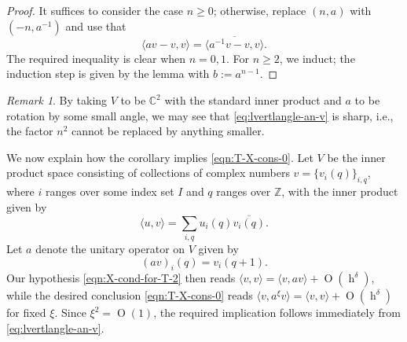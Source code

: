 \documentclass[reqno,10pt]{amsart}
\theoremstyle{plain} %
\theoremstyle{definition}
\theoremstyle{plain} %
\theoremstyle{remark}
\newtheorem*{remark*}            {Remark}
\theoremstyle{itplain} %
\theoremstyle{remark} %
\renewcommand{\geq}{\geqslant}
\numberwithin{equation}{section}
\def\O{\operatorname{O}}
\DeclareMathOperator{\h}{h}
\begin{document}
\begin{proof}
  It suffices to consider the case $n \geq 0$; otherwise, replace $(n,a)$ with $(-n, a^{-1})$ and use that
  \begin{equation*}
    \langle a v - v, v \rangle = \overline{\langle a^{-1} v - v, v \rangle}.
  \end{equation*}
  The required inequality is clear when $n=0,1$.  For $n \geq 2$, we induct; the induction step is given by the lemma with $b := a^{n-1}$.
\end{proof}
\begin{remark*}
  By taking $V$ to be $\mathbb{C}^2$ with the standard inner product and $a$ to be rotation by some small angle, we may see that \eqref{eq:lvertlangle-an-v} is sharp, i.e., the factor $n^2$ cannot be replaced by anything smaller.
\end{remark*}

We now explain how the corollary implies \eqref{eqn:T-X-cons-0}.  Let $V$ be the inner product space consisting of collections of complex numbers $v = \{v_i(q)\}_{i,q}$, where $i$ ranges over some index set $I$ and $q$ ranges over $\mathbb{Z}$, with the inner product given by
\begin{equation*}
\langle u, v \rangle = \sum_{i,q} u_i(q) \overline{v_i(q)}.
\end{equation*}
 Let $a$ denote the unitary operator on $V$ given by
 \begin{equation*}
(a v)_i(q) = v_i(q+1).
\end{equation*}
Our hypothesis \eqref{eqn:X-cond-for-T-2} then reads $\langle v, v \rangle = \langle v, a v \rangle + \O(\h^\delta)$, while the desired conclusion \eqref{eqn:T-X-cons-0} reads $\langle v, a^{\xi} v \rangle = \langle v, v \rangle + \O(\h^\delta)$ for fixed $\xi$.  Since $\xi^2 = \O(1)$, the required implication follows immediately from \eqref{eq:lvertlangle-an-v}.
\end{document}
